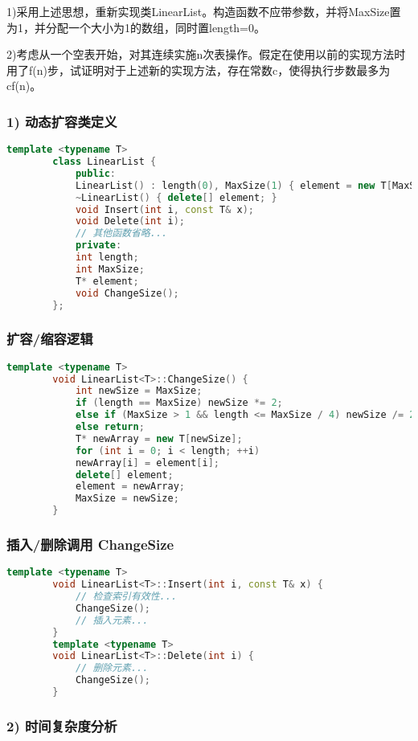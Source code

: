 \documentclass[UTF8]{ctexart}
\begin{document}
	1)采用上述思想，重新实现类LinearList。构造函数不应带参数，并将MaxSize置为1，并分配一个大小为1的数组，同时置length=0。
	
	2)考虑从一个空表开始，对其连续实施n次表操作。假定在使用以前的实现方法时用了f(n)步，试证明对于上述新的实现方法，存在常数c，使得执行步数最多为cf(n)。
	
	\subsubsection{1) 动态扩容类定义}
	
	\begin{lstlisting}[language=C++]
		template <typename T>
		class LinearList {
			public:
			LinearList() : length(0), MaxSize(1) { element = new T[MaxSize]; }
			~LinearList() { delete[] element; }
			void Insert(int i, const T& x);
			void Delete(int i);
			// 其他函数省略...
			private:
			int length;
			int MaxSize;
			T* element;
			void ChangeSize();
		};
	\end{lstlisting}
	\subsubsection{扩容/缩容逻辑}
	
	\begin{lstlisting}[language=C++]
		template <typename T>
		void LinearList<T>::ChangeSize() {
			int newSize = MaxSize;
			if (length == MaxSize) newSize *= 2;
			else if (MaxSize > 1 && length <= MaxSize / 4) newSize /= 2;
			else return;
			T* newArray = new T[newSize];
			for (int i = 0; i < length; ++i)
			newArray[i] = element[i];
			delete[] element;
			element = newArray;
			MaxSize = newSize;
		}
	\end{lstlisting}
	\subsubsection{插入/删除调用 ChangeSize}
	
	\begin{lstlisting}[language=C++]
		template <typename T>
		void LinearList<T>::Insert(int i, const T& x) {
			// 检查索引有效性...
			ChangeSize();
			// 插入元素...
		}
		template <typename T>
		void LinearList<T>::Delete(int i) {
			// 删除元素...
			ChangeSize();
		}
	\end{lstlisting}
	\subsubsection{2) 时间复杂度分析}
	
\end{document}
